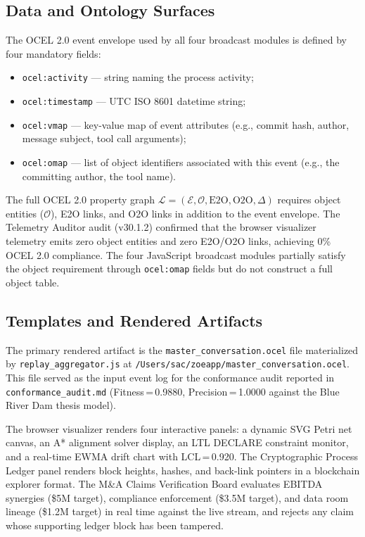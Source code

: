 \subsection{Data and Ontology Surfaces}
\label{sec:livestream-impl-data}

The OCEL 2.0 event envelope used by all four broadcast modules is defined by four
mandatory fields:
\begin{itemize}
  \item \texttt{ocel:activity} --- string naming the process activity;
  \item \texttt{ocel:timestamp} --- UTC ISO 8601 datetime string;
  \item \texttt{ocel:vmap} --- key-value map of event attributes (e.g., commit hash,
    author, message subject, tool call arguments);
  \item \texttt{ocel:omap} --- list of object identifiers associated with this event
    (e.g., the committing author, the tool name).
\end{itemize}

The full OCEL 2.0 property graph $\mathcal{L} = (\mathcal{E}, \mathcal{O},
\text{E2O}, \text{O2O}, \Delta)$ requires object entities ($\mathcal{O}$), E2O
links, and O2O links in addition to the event envelope. The Telemetry Auditor audit
(v30.1.2) confirmed that the browser visualizer telemetry emits zero object entities
and zero E2O/O2O links, achieving 0\% OCEL 2.0 compliance. The four JavaScript
broadcast modules partially satisfy the object requirement through \texttt{ocel:omap}
fields but do not construct a full object table.

\subsection{Templates and Rendered Artifacts}
\label{sec:livestream-impl-templates}

The primary rendered artifact is the \texttt{master\_conversation.ocel} file
materialized by \texttt{replay\_aggregator.js} at
\texttt{/Users/sac/zoeapp/master\_conversation.ocel}. This file served as the
input event log for the conformance audit reported in \texttt{conformance\_audit.md}
(Fitness\,=\,0.9880, Precision\,=\,1.0000 against the Blue River Dam thesis model).

The browser visualizer renders four interactive panels: a dynamic SVG Petri net
canvas, an A* alignment solver display, an LTL DECLARE constraint monitor, and a
real-time EWMA drift chart with LCL\,=\,0.920. The Cryptographic Process Ledger
panel renders block heights, hashes, and back-link pointers in a blockchain explorer
format. The M\&A Claims Verification Board evaluates EBITDA synergies
(\$5M target), compliance enforcement (\$3.5M target), and data room lineage
(\$1.2M target) in real time against the live stream, and rejects any claim whose
supporting ledger block has been tampered.
